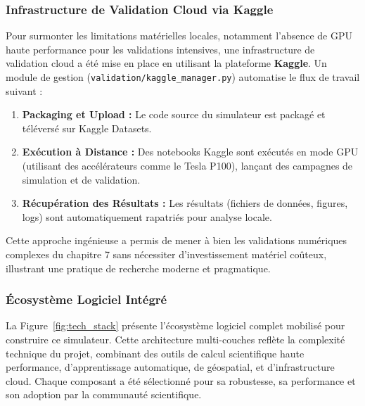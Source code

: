 \subsubsection{Infrastructure de Validation Cloud via Kaggle}
Pour surmonter les limitations matérielles locales, notamment l'absence de GPU haute performance pour les validations intensives, une infrastructure de validation cloud a été mise en place en utilisant la plateforme \textbf{Kaggle}. Un module de gestion (\texttt{validation/kaggle\_manager.py}) automatise le flux de travail suivant :
\begin{enumerate}
       \item \textbf{Packaging et Upload :} Le code source du simulateur est packagé et téléversé sur Kaggle Datasets.
       \item \textbf{Exécution à Distance :} Des notebooks Kaggle sont exécutés en mode GPU (utilisant des accélérateurs comme le Tesla P100), lançant des campagnes de simulation et de validation.
       \item \textbf{Récupération des Résultats :} Les résultats (fichiers de données, figures, logs) sont automatiquement rapatriés pour analyse locale.
\end{enumerate}
Cette approche ingénieuse a permis de mener à bien les validations numériques complexes du chapitre 7 sans nécessiter d'investissement matériel coûteux, illustrant une pratique de recherche moderne et pragmatique.

\subsubsection{Écosystème Logiciel Intégré}
La Figure~\ref{fig:tech_stack} présente l'écosystème logiciel complet mobilisé pour construire ce simulateur. Cette architecture multi-couches reflète la complexité technique du projet, combinant des outils de calcul scientifique haute performance, d'apprentissage automatique, de géospatial, et d'infrastructure cloud. Chaque composant a été sélectionné pour sa robustesse, sa performance et son adoption par la communauté scientifique.

